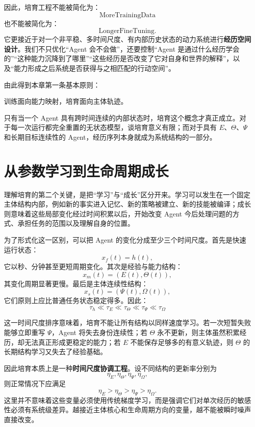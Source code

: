 因此，培育工程不能被简化为：
\[
\text{MoreTrainingData}
\]
也不能被简化为：
\[
\text{LongerFineTuning}.
\]
它更接近于对一个非平稳、多时间尺度、有内部历史状态的动力系统进行\textbf{经历空间设计}。我们不只优化“Agent 会不会做”，还要控制“Agent 是通过什么经历学会的”“这种能力沉降到了哪里”“这些经历是否改变了它对自身和世界的解释”，以及“能力形成之后系统是否获得与之相匹配的行动空间”。

由此得到本章第一条基本原则：
\begin{proposition*}
训练面向能力映射，培育面向主体轨迹。
\end{proposition*}

只有当一个 Agent 具有跨时间连续的内部状态时，培育这个概念才真正成立。对于每一次运行都完全重置的无状态模型，谈培育意义有限；而对于具有 $E$、$\Theta$、$\Psi$ 和长期目标连续性的 Agent，经历序列本身就成为系统结构的一部分。

\section{从参数学习到生命周期成长}

理解培育的第二个关键，是把“学习”与“成长”区分开来。学习可以发生在一个固定主体结构内部，例如新的事实进入记忆、新的策略被建立、新的技能被编译；成长则意味着这些局部变化经过时间积累以后，开始改变 Agent 今后处理问题的方式、承担任务的范围以及理解自身的位置。

为了形式化这一区别，可以把 Agent 的变化分成至少三个时间尺度。首先是快速运行状态：
\[
x_f(t)=h(t),
\]
它以秒、分钟甚至更短周期变化。其次是经验与能力结构：
\[
x_m(t)=
\left(
E(t),\Theta(t)
\right),
\]
其变化周期显著更慢。最后是主体连续性结构：
\[
x_s(t)
=
\left(
\Psi(t),\Omega(t)
\right),
\]
它们原则上应比普通任务状态稳定得多。因此：
\[
\boxed{
\tau_h
\ll
\tau_E
\ll
\tau_{\Theta}
\ll
\tau_{\Psi}
\ll
\tau_{\Omega}
}
\]

这一时间尺度排序意味着，培育不能让所有结构以同样速度学习。若一次短暂失败能够立即重写 $\Psi$，Agent 将失去身份连续性；若 $\Theta$ 永不更新，则主体虽然积累经历，却无法真正形成更稳定的能力；若 $E$ 不能保存足够多的有意义轨迹，则 $\Theta$ 的长期结构学习又失去了经验基础。

因此培育本质上是一种\textbf{时间尺度协调工程}。设不同结构的更新率分别为
\[
\eta_E,\eta_{\Theta},\eta_{\Psi},\eta_{\Omega},
\]
则正常情况下应满足
\[
\boxed{
\eta_E
>
\eta_{\Theta}
>
\eta_{\Psi}
>
\eta_{\Omega}.
}
\]
这里并不意味着这些变量必须使用传统梯度学习，而是强调它们对单次经历的敏感性必须有系统级差异。越接近主体核心和生命周期方向的变量，越不能被瞬时噪声直接改变。

